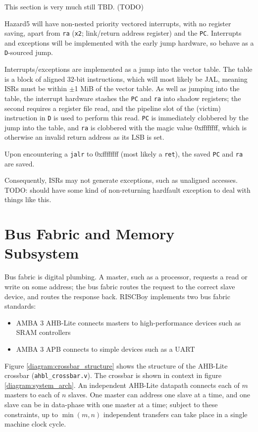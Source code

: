 \documentclass[notitlepage]{article}
\begin{document}
This section is very much still TBD. (TODO)

Hazard5 will have non-nested priority vectored interrupts, with no register saving, apart from \texttt{ra} (\texttt{x2}; link/return address register) and the \texttt{PC}. Interrupts and exceptions will be implemented with the early jump hardware, so behave as a \texttt{D}-sourced jump.

Interrupts/exceptions are implemented as a jump into the vector table. The table is a block of aligned 32-bit instructions, which will most likely be JAL, meaning ISRs must be within $\pm$1 MiB of the vector table. As well as jumping into the table, the interrupt hardware stashes the \texttt{PC} and \texttt{ra} into shadow registers; the second requires a register file read, and the pipeline slot of the (victim) instruction in \texttt{D} is used to perform this read. \texttt{PC} is immediately clobbered by the jump into the table, and \texttt{ra} is clobbered with the magic value 0xffffffff, which is otherwise an invalid return address as its LSB is set.

Upon encountering a \texttt{jalr} to 0xffffffff (most likely a \texttt{ret}), the saved \texttt{PC} and \texttt{ra} are saved.

Consequently, ISRs may not generate exceptions, such as unaligned accesses. TODO: should have some kind of non-returning hardfault exception to deal with things like this.


\section{Bus Fabric and Memory Subsystem}

Bus fabric is digital plumbing. A master, such as a processor, requests a read or write on some address; the bus fabric routes the request to the correct slave device, and routes the response back. RISCBoy implements two bus fabric standards:

\begin{itemize}
\item AMBA 3 AHB-Lite connects masters to high-performance devices such as SRAM controllers
\item AMBA 3 APB connects to simple devices such as a UART
\end{itemize}

Figure \ref{diagram:crossbar_structure} shows the structure of the AHB-Lite crossbar (\texttt{ahbl\_crossbar.v}). The crossbar is shown in context in figure \ref{diagram:system_arch}. An independent AHB-Lite datapath connects each of $m$ masters to each of $n$ slaves. One master can address one slave at a time, and one slave can be in data-phase with one master at a time; subject to these constraints, up to $\min(m,n)$ independent transfers can take place in a single machine clock cycle.
\end{document}
